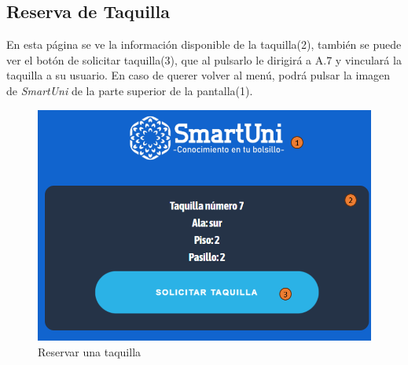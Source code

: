 \documentclass[12pt]{report}
\begin{document}
\begin{appendices}
\section{Reserva de Taquilla}
En esta página se ve la información disponible de la taquilla(2), también se puede ver el botón de solicitar taquilla(3), que al pulsarlo le dirigirá a A.7 y vinculará la taquilla a su usuario. En caso de querer volver al menú, podrá pulsar la imagen de \textit{SmartUni} de la parte superior de la pantalla(1).\\
\begin{figure}[H]
    \centering
    \includegraphics[scale = 0.7]{imagenes//manual_de_usuario/8.png}
    \caption{Reservar una taquilla}
    \label{fig:Figura3.4.3}
\end{figure}
\newpage

\end{appendices}
\end{document}
